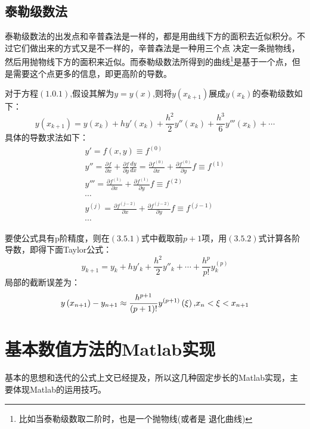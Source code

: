 \documentclass[a4paper,12pt]{article}
\begin{document}
\subsection{泰勒级数法}
泰勒级数法的出发点和辛普森法是一样的，都是用曲线下方的面积去近似积分。不过它们做出来的方式又是不一样的，辛普森法是一种用三个点
决定一条抛物线，然后用抛物线下方的面积来近似。而泰勒级数法所得到的曲线\footnote{比如当泰勒级数取二阶时，也是一个抛物线(或者是
退化曲线)}是基于一个点，但是需要这个点更多的信息，即更高阶的导数。\par
对于方程$(1.0.1)$,假设其解为$y=y(x)$,则将$y(x_{k+1})$展成$y(x_{k})$的泰勒级数如下：
\begin{equation}
y\left( {{x_{k + 1}}} \right) = y\left( {{x_k}} \right) + hy'\left( {{x_k}} \right) + \frac{{{h^2}}}{2}y''\left( {{x_k}} \right) + \frac{{{h^3}}}{6}y'''\left( {{x_k}} \right) + \cdots
\end{equation}
具体的导数求法如下：
\begin{equation}
\begin{array}{l}
y' = f(x,y) \equiv {f^{(0)}}\\
y'' = \frac{{\partial f}}{{\partial x}} + \frac{{\partial f}}{{\partial y}}\frac{{dy}}{{dx}} = \frac{{\partial {f^{(0)}}}}{{\partial x}} + \frac{{\partial {f^{(0)}}}}{{\partial y}}f \equiv {f^{(1)}}\\
y''' = \frac{{\partial {f^{(1)}}}}{{\partial x}} + \frac{{\partial {f^{(1)}}}}{{\partial y}}f \equiv {f^{(2)}}\\
 \cdots \\
{y^{(j)}} = \frac{{\partial {f^{(j - 2)}}}}{{\partial x}} + \frac{{\partial {f^{(j - 2)}}}}{{\partial y}}f \equiv {f^{(j - 1)}}\\
 \cdots
\end{array}
\end{equation}

要使公式具有p阶精度，则在$(3.5.1)$式中截取前$p+1$项，用$(3.5.2)$式计算各阶导数，即得下面Taylor公式：
\begin{equation}
{y_{k + 1}} = {y_k} + h{y'_k} + \frac{{{h^2}}}{2}{y''_k} +  \cdots  + \frac{{{h^p}}}{{p!}}y_k^{(p)}
\end{equation}
局部的截断误差为：
\[ y\left( {{x_{n + 1}}} \right) - {y_{n + 1}} \approx \frac{{{h^{p + 1}}}}{{\left( {p + 1} \right)!}}{y^{(p + 1)}}\left( \xi  \right){\rm{,    }}{x_n} < \xi  < {x_{n + 1}}\]

\section{基本数值方法的Matlab实现}
基本的思想和迭代的公式上文已经提及，所以这几种固定步长的Matlab实现，主要体现Matlab的运用技巧。
\end{document}
